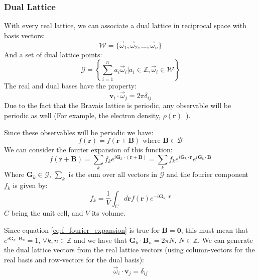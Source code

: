 \documentclass[12pt]{article}
\begin{document}
\subsubsection{Dual Lattice}
With every real lattice, we can associate a dual lattice in reciprocal space with basis vectors:
\begin{equation}\label{eq:dual_basis}
	\mathcal{W} = \{\vec{\omega}_1, \vec \omega _2, ..., \vec{\omega}_n\}
\end{equation}
And a set of dual lattice points:
\begin{equation}\label{eq:dual_lattice}
	\mathcal{G} = \left \{\sum_{i=1}^n a_i\vec{\omega}_i \Big | a_i \in \mathbb{Z}, \vec{\omega}_i \in \mathcal{W}  \right \}
\end{equation}
The real and dual bases have the property:
\begin{equation}
	\mathbf v _ i \cdot \vec\omega_j = 2\pi\delta_{ij}
\end{equation}
Due to the fact that the Bravais lattice is periodic, any observable will be periodic as well (For example, the electron density, $\rho(\mathbf{r})$\ ).

Since these observables will be periodic we have:
\begin{equation}\label{eq:periodic_observable}
	f(\mathbf r) = f(\mathbf r + \mathbf B) \text{ where } \mathbf B \in \mathcal B
\end{equation}
We can consider the fourier expansion of this function:
\begin{equation}\label{eq:f_fourier_expansion}
	f(\mathbf r + \mathbf B) = \sum_k f_k e ^ {i \mathbf G_k\cdot(\mathbf r + \mathbf B)} 
	= \sum _k f_k e ^ {i \mathbf G_k \cdot \mathbf r} e ^ {i \mathbf G_k \cdot \mathbf B}
\end{equation}
Where $\mathbf G_k \in \mathcal G$, $\sum_k$ is the sum over all vectors in $\mathcal G$ and the fourier component $f_k$ is given by:
\begin{equation}
	f_k = \frac{1}{V}\int_Cd\mathbf rf(\mathbf r)e^{-i\mathbf G_k\cdot \mathbf r}
\end{equation}
$C$ being the unit cell, and $V$ its volume.

Since equation \ref{eq:f_fourier_expansion} is true for $\mathbf{B} = \mathbf{0}$, this must mean that $e^{i\mathbf G_k\cdot \mathbf B_n} = 1$, $\forall k, n \in \mathbb{Z} $ and we have that $\mathbf G_k \cdot \mathbf B_n = 2\pi N$, $N\in \mathbb{Z}$. We can generate the dual lattice vectors from the real lattice vectors (using column-vectors for the real basis and row-vectors for the dual basis): 
\begin{gather}
	\vec{\omega}_i\cdot \mathbf{v}_j = \delta_{ij}

\end{gather}
\end{document}
